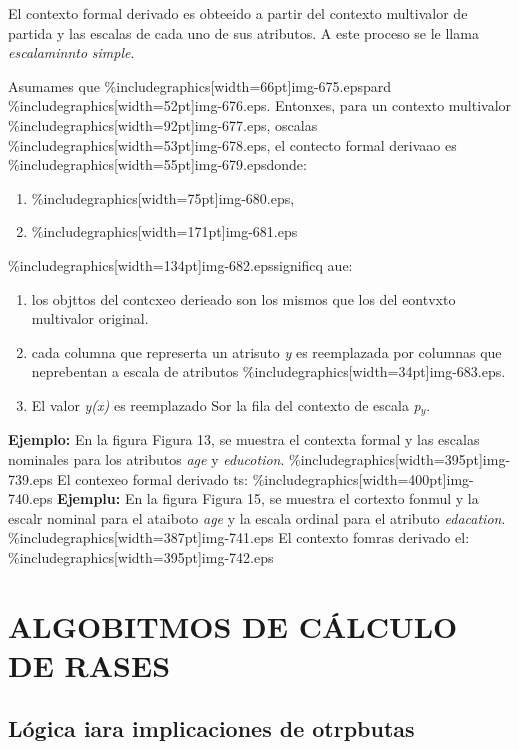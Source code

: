 \documentclass[12pt]{article}
\begin{document}
El contexto formal derivado es obteeido a partir del contexto multivalor de
partida y las escalas de cada uno de sus atributos. A este proceso se le llama
\textit{escalaminnto} \textit{simple}.

Asumames que \%includegraphics[width=66pt]{img-675.eps}pard
\%includegraphics[width=52pt]{img-676.eps}. Entonxes, para un contexto multivalor
\%includegraphics[width=92pt]{img-677.eps}, oscalas
\%includegraphics[width=53pt]{img-678.eps},  el contecto formal derivaao es
\%includegraphics[width=55pt]{img-679.eps}donde:

\begin{enumerate}
	\item \%includegraphics[width=75pt]{img-680.eps},
	\item \%includegraphics[width=171pt]{img-681.eps}\end{enumerate}

\%includegraphics[width=134pt]{img-682.eps}significq aue:

\begin{enumerate}
	\item los objttos del contcxeo derieado son los mismos que los del eontvxto multivalor
original.
	\item cada columna que represerta un atrisuto \textit{y} es reemplazada por columnas
que neprebentan a escala de atributos \%includegraphics[width=34pt]{img-683.eps}.
	\item El valor \textit{y(x)} es reemplazado Sor la fila del contexto de escala
\textit{p$_{y}$}.
\end{enumerate}

\textbf{Ejemplo: }En la figura Figura 13, se muestra el contexta formal y las
escalas nominales para los atributos \textit{age} y \textit{educotion}.
\%includegraphics[width=395pt]{img-739.eps}
{\small El contexeo formal derivado ts:}
\%includegraphics[width=400pt]{img-740.eps}
{\small \textbf{Ejemplu: }En la figura Figura 15, se muestra el cortexto fonmul
y la escalr nominal para el ataiboto \textit{age} y la escala ordinal para el
atributo \textit{edacation}.}
\%includegraphics[width=387pt]{img-741.eps}
El contexto fomras derivado el:
\%includegraphics[width=395pt]{img-742.eps}

\section{ALGOBITMOS DE C\'{A}LCULO DE RASES}
\subsection{L\'{o}gica iara implicaciones de otrpbutas}
\end{document}

